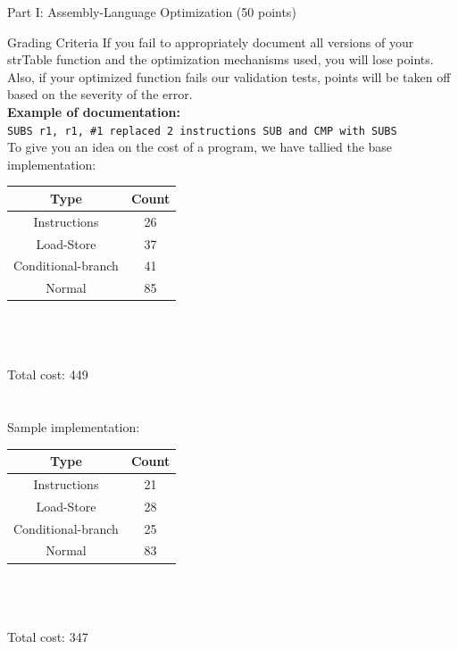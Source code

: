 \documentclass{article}
\begin{document}
\begin{section}{Part I: Assembly-Language Optimization (50 points)}
\begin{subsection}{Grading Criteria}
        If you fail to appropriately document all versions of your strTable function and the optimization mechanisms used, you will lose points. Also, if your optimized function fails our validation tests, points will be taken off based on the severity of the error. \\
        \noindent
        \textbf{Example of documentation:} \\
        \texttt{SUBS r1, r1, \#1 \@ replaced 2 instructions SUB and CMP with SUBS} \\

        To give you an idea on the cost of a program, we have tallied the base implementation: \\
        \begin{tabular}{|c|c|}
          \hline
          Type & Count \\ \hline
          Instructions & 26  \\ \hline
          Load-Store & 37  \\ \hline
          Conditional-branch & 41  \\ \hline
          Normal & 85  \\ \hline
        \end{tabular}
        \\ \\ \\ Total cost: 449 \\ \\ \\
        \vspace*{0.1in}
        Sample implementation: \\
        \begin{tabular}{|c|c|}
          \hline
          Type & Count  \\ \hline
          Instructions & 21  \\\hline
          Load-Store & 28 \\ \hline
          Conditional-branch & 25 \\ \hline
          Normal & 83\\ \hline
        \end{tabular}
        \\ \\ \\Total cost: 347 \\ \\ \\

\end{subsection}
\end{section}
\end{document}
